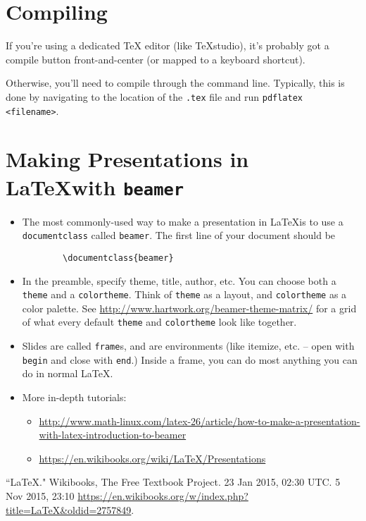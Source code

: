 \documentclass[12pt]{article}
\begin{document}
	\section{Compiling}
	If you're using a dedicated TeX editor (like TeXstudio), it's probably got a compile button front-and-center (or mapped to a keyboard shortcut). 
	
	Otherwise, you'll need to compile through the command line. Typically, this is done by navigating to the location of the \texttt{.tex} file and run \texttt{pdflatex <filename>}.
	
	\section{Making Presentations in \LaTeX with \texttt{beamer}}
	\begin{itemize}
		\item The most commonly-used way to make a presentation in \LaTeX is to use a \texttt{documentclass} called \texttt{beamer}. The first line of your document should be
		\begin{verbatim}
		\documentclass{beamer}
		\end{verbatim}
		\item In the preamble, specify theme, title, author, etc. You can choose both a \texttt{theme} and a \texttt{colortheme}. Think of \texttt{theme} as a layout, and \texttt{colortheme} as a color palette. See \url{http://www.hartwork.org/beamer-theme-matrix/} for a grid of what every default \texttt{theme} and \texttt{colortheme} look like together.
		\item Slides are called \texttt{frame}s, and are environments (like itemize, etc. -- open with \texttt{begin} and close with \texttt{end}.) Inside a frame, you can do most anything you can do in normal \LaTeX.
		\item More in-depth tutorials:
		\begin{itemize}
			\item \url{http://www.math-linux.com/latex-26/article/how-to-make-a-presentation-with-latex-introduction-to-beamer}
			\item \url{https://en.wikibooks.org/wiki/LaTeX/Presentations}
		\end{itemize}
	\end{itemize}
	
	\begin{thebibliography}{99}
		 ``LaTeX." Wikibooks, The Free Textbook Project. 23 Jan 2015, 02:30 UTC. 5 Nov 2015, 23:10 \url{https://en.wikibooks.org/w/index.php?title=LaTeX&oldid=2757849}.
	\end{thebibliography}
	
\end{document}
